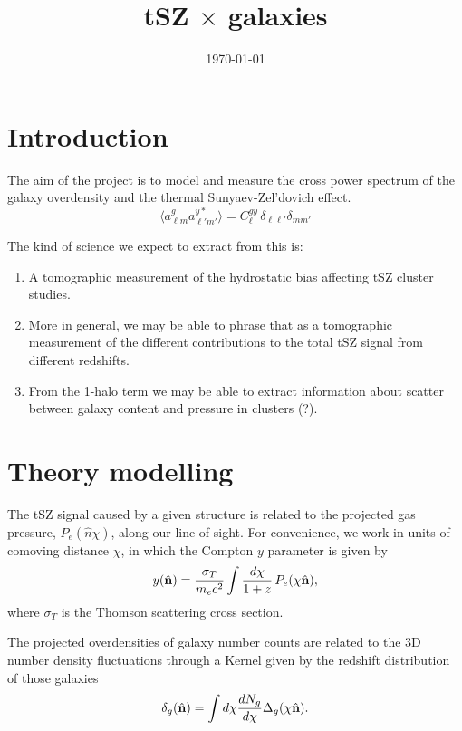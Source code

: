 \documentclass{article}
\title{tSZ $\times$ galaxies}
\date{\today}
\newcommand{\nv}{\hat{\bf n}}
\begin{document}
\maketitle

\section{Introduction}
  The aim of the project is to model and measure the cross power spectrum of the galaxy overdensity and the thermal Sunyaev-Zel'dovich effect.
  \begin{equation}
    \langle a^g_{\ell m} a^{y*}_{\ell' m'} \rangle=C^{gy}_\ell\,\delta_{\ell\ell'}\delta_{mm'}
  \end{equation}

  The kind of science we expect to extract from this is:
  \begin{enumerate}
    \item A tomographic measurement of the hydrostatic bias affecting tSZ cluster studies.
    \item More in general, we may be able to phrase that as a tomographic measurement of the different contributions to the total tSZ signal from different redshifts.
    \item From the 1-halo term we may be able to extract information about scatter between galaxy content and pressure in clusters (?).
  \end{enumerate}

\section{Theory modelling}
  The tSZ signal caused by a given structure is related to the projected gas pressure, $P_e(\hat{n} \chi)$, along our line of sight. For convenience, we work in units of comoving distance $\chi$, in which the Compton $y$ parameter is given by
  \begin{equation}
    y(\nv) = \frac{\sigma_T}{m_e c^2} \int \frac{d\chi}{1+z}\,P_e(\chi\nv),
  \end{equation}
  where $\sigma_T$ is the Thomson scattering cross section.

  The projected overdensities of galaxy number counts are related to the 3D number density fluctuations through a Kernel given by the redshift distribution of those galaxies
  \begin{equation}
    \delta_g(\nv) = \int d\chi\frac{dN_g}{d\chi} \Delta_g(\chi\nv).
  \end{equation}
\end{document}
